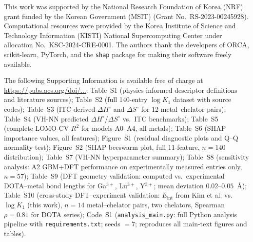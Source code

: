 \documentclass[journal=jacsat,manuscript=article]{achemso}
\begin{document}
\begin{acknowledgement}
This work was supported by the National Research Foundation of Korea (NRF) grant
funded by the Korean Government (MSIT) (Grant No.~RS-2023-00245928).
Computational resources were provided by the Korea Institute of Science and
Technology Information (KISTI) National Supercomputing Center under
allocation No.~KSC-2024-CRE-0001.
The authors thank the developers of ORCA,\cite{Neese2020}
scikit-learn,\cite{Pedregosa2011} PyTorch,\cite{Paszke2019}
and the \texttt{shap} package\cite{Lundberg2017}
for making their software freely available.
\end{acknowledgement}

\begin{suppinfo}
The following Supporting Information is available free of charge at
\url{https://pubs.acs.org/doi/...}:
Table~S1 (physics-informed descriptor definitions and literature sources);
Table~S2 (full 140-entry $\log K_1$ dataset with source codes);
Table~S3 (ITC-derived $\Delta H^\circ$ and $\Delta S^\circ$ for 12 metal--chelator pairs);
Table~S4 (VH-NN predicted $\Delta H^\circ$/$\Delta S^\circ$ vs.\ ITC benchmarks);
Table~S5 (complete LOMO-CV $R^2$ for models A0--A4, all metals);
Table~S6 (SHAP importance values, all features);
Figure~S1 (residual diagnostic plots and Q--Q normality test);
Figure~S2 (SHAP beeswarm plot, full 11-feature, $n = 140$ distribution);
Table~S7 (VH-NN hyperparameter summary);
Table~S8 (sensitivity analysis: A2 GBM+DFT performance on experimentally
measured entries only, $n = 57$);
Table~S9 (DFT geometry validation: computed vs.\ experimental DOTA--metal
bond lengths for Ga$^{3+}$, Lu$^{3+}$, Y$^{3+}$;\cite{Kim2026molpharm}
mean deviation $0.02$--$0.05$~\AA);
Table~S10 (cross-study DFT--experiment validation: $E_\mathrm{int}$ from
Kim et al.\cite{Kim2026molpharm} vs.\ $\log K_1$ (this work), $n = 14$
metal--chelator pairs, two chelators, Spearman $\rho = 0.81$ for DOTA series);
Code~S1 (\texttt{analysis\_main.py}: full Python analysis pipeline with
\texttt{requirements.txt}; seeds $= 7$; reproduces all main-text figures and tables).
\end{suppinfo}


\end{document}
